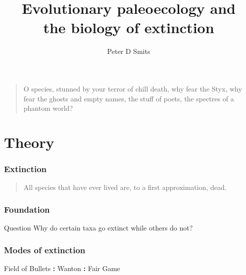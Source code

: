 \documentclass{beamer}
\title{Evolutionary paleoecology and \\the biology of extinction}
\author{Peter D Smits}
\institute{Committee on Evolutionary Biology, University of Chicago}
\begin{document}
\begin{frame}
  \begin{quotation}
    O species, stunned by your terror of chill death, why fear the Styx, why
    fear the ghosts and empty names, the stuff of poets, the spectres of a
    phantom world?

    \vspace{0.5cm}

    \tiny{}
  \end{quotation}
\end{frame}

\begin{frame}
  \maketitle
\end{frame}

\begin{frame}
  \tableofcontents
\end{frame}


\section{Theory}

\begin{frame}
  \frametitle{Extinction}

  \begin{quotation}
    All species that have ever lived are, to a first approximation, dead.

    \tiny{}
  \end{quotation}
\end{frame}

\begin{frame}
  \frametitle{Foundation}

  \begin{alertblock}{Question}
    Why do certain taxa go extinct while others do not?
  \end{alertblock}
\end{frame}

\begin{frame}
  \frametitle{Modes of extinction}

   Field of Bullets 
   \textbf{:} 
   Wanton 
   \textbf{:} 
   Fair Game 

  \bigskip

  \tiny{}

\end{frame}
\end{document}
